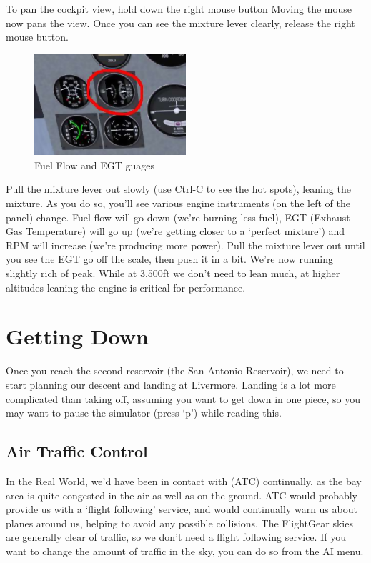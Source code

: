 To pan the cockpit view, hold down the right mouse button Moving the mouse now
pans the view. Once you can see the mixture lever clearly, release the right
mouse button.

\begin{figure}[!htp]
\centering
\includegraphics[width=0.5\textwidth]{fuel_flow}
\caption{Fuel Flow and EGT guages\label{egt}}
\end{figure}

Pull the mixture lever out slowly (use Ctrl-C to see the hot spots),
leaning the mixture. As you do so, you'll see various engine instruments
(on the left of the panel) change. Fuel flow will go down (we're burning
less fuel), EGT (Exhaust Gas Temperature) will go up (we're getting closer
to a `perfect mixture') and RPM will increase (we're producing more power).
Pull the mixture lever out until you see the EGT go off the scale, then
push it in a bit. We're now running slightly rich of peak. While at
3,500ft we don't need to lean much, at higher altitudes leaning the
engine is critical for performance.

\section{Getting Down}

Once you reach the second reservoir (the San Antonio Reservoir),
we need to start planning our descent and landing at Livermore.
Landing is a lot more complicated than taking off, assuming you
want to get down in one piece, so you may want to pause the
simulator (press `p') while reading this.

\subsection{Air Traffic Control}

In the Real World, we'd have been in contact with  (ATC)
continually, as the bay area is quite congested in the air as well as on the ground.
ATC would probably provide us with a `flight following' service, and would continually
warn us about planes around us, helping to avoid any possible collisions.
The FlightGear skies are generally clear of traffic, so we don't need a flight following service.
If you want to change the amount of traffic in the sky, you can do so from the AI menu.

